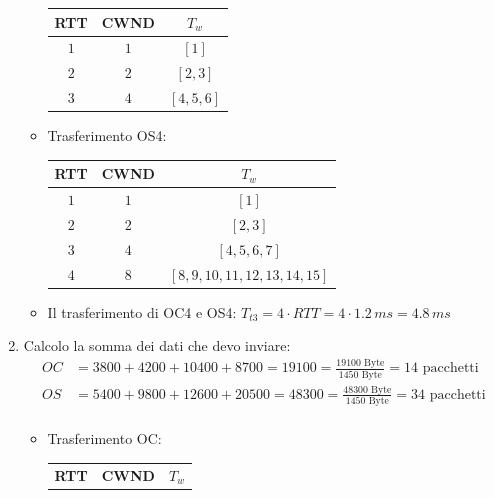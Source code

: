\documentclass[10pt]{article}
\newcommand{\lightrule}{%
	\arrayrulecolor{black!30}%
	\midrule[\lightrulewidth]%
	\arrayrulecolor{black}}
\begin{document}
\begin{enumerate}
\begin{itemize}
\begin{center}
				\centering
 				\begin{tabular}{@{} *{3}{c} @{}}
 				\toprule
 					\textbf{RTT} & \textbf{CWND} & \textbf{$T_w$} \\
 				\midrule
 					$1$ & $1$ & $[1]$ \\ 
				\lightrule
 					$2$ & $2$ & $[2,3]$ \\  
 				\lightrule
 					$3$ & $4$ & $[4,5,6]$ \\
				\bottomrule
				\end{tabular}
			\end{center}
			\item Trasferimento OS4:
			\begin{center}
				\centering
 				\begin{tabular}{@{} *{3}{c} @{}}
 				\toprule
 					\textbf{RTT} & \textbf{CWND} & \textbf{$T_w$} \\
 				\midrule
 					$1$ & $1$ & $[1]$ \\ 
				\lightrule
 					$2$ & $2$ & $[2,3]$ \\
				\lightrule
 					$3$ & $4$ & $[4,5,6,7]$ \\ 				
 				\lightrule
 					$4$ & $8$ & $[8,9,10,11,12,13,14,15]$ \\
				\bottomrule
				\end{tabular}
			\end{center}
			\item Il trasferimento di OC4 e OS4: $T_{t3} = 4 \cdot RTT = 4 \cdot 1.2 \,ms = 4.8 \,ms$
		\end{itemize}
		\item
		Calcolo la somma dei dati che devo inviare:
		\begin{equation*}
			\begin{split}
				OC & = 3800 + 4200 + 10400 + 8700 = 19100 = \frac{19100 \textrm{ Byte}}{1450 \textrm{ Byte}} = 14 \textrm{ pacchetti}\\  
				OS & = 5400 + 9800 + 12600 + 20500 = 48300 = \frac{48300 \textrm{ Byte}}{1450 \textrm{ Byte}} = 34 \textrm{ pacchetti}\\  
			\end{split}
			\end{equation*}
			\begin{itemize}
				\item Trasferimento OC:
				\begin{center}
					\centering
 					\begin{tabular}{@{} *{3}{c} @{}}
 					\toprule
 						\textbf{RTT} & \textbf{CWND} & \textbf{$T_w$} \\

\end{tabular}
\end{center}
\end{itemize}
\end{enumerate}
\end{document}
